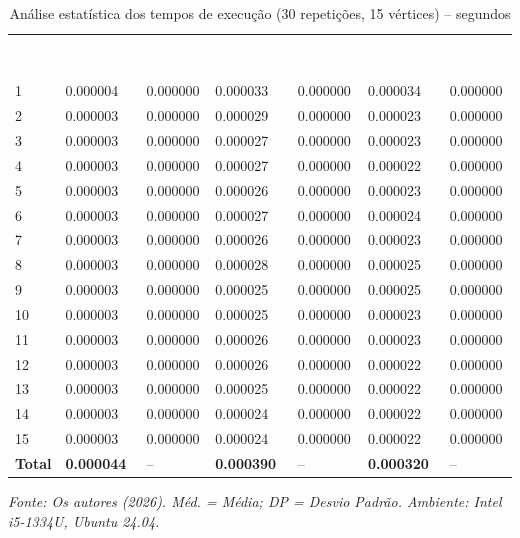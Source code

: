 \documentclass[12pt, a4paper]{article}
\begin{document}
\begin{table}[H]
\centering
\caption{Análise estatística dos tempos de execução (30 repetições, 15 vértices) -- segundos}
\small
\begin{tabular}{lllllll}
\rowcolor{azulescuro}
\textcolor{white}{\textbf{Orig.}} & \textcolor{white}{\textbf{Méd. Dij.}} & \textcolor{white}{\textbf{DP Dij.}} & \textcolor{white}{\textbf{Méd. Bel.}} & \textcolor{white}{\textbf{DP Bel.}} & \textcolor{white}{\textbf{Méd. FW}} & \textcolor{white}{\textbf{DP FW}} \\
1  & 0.000004 & 0.000000 & 0.000033 & 0.000000 & 0.000034 & 0.000000 \\
2  & 0.000003 & 0.000000 & 0.000029 & 0.000000 & 0.000023 & 0.000000 \\
3  & 0.000003 & 0.000000 & 0.000027 & 0.000000 & 0.000023 & 0.000000 \\
4  & 0.000003 & 0.000000 & 0.000027 & 0.000000 & 0.000022 & 0.000000 \\
5  & 0.000003 & 0.000000 & 0.000026 & 0.000000 & 0.000023 & 0.000000 \\
6  & 0.000003 & 0.000000 & 0.000027 & 0.000000 & 0.000024 & 0.000000 \\
7  & 0.000003 & 0.000000 & 0.000026 & 0.000000 & 0.000023 & 0.000000 \\
8  & 0.000003 & 0.000000 & 0.000028 & 0.000000 & 0.000025 & 0.000000 \\
9  & 0.000003 & 0.000000 & 0.000025 & 0.000000 & 0.000025 & 0.000000 \\
10 & 0.000003 & 0.000000 & 0.000025 & 0.000000 & 0.000023 & 0.000000 \\
11 & 0.000003 & 0.000000 & 0.000026 & 0.000000 & 0.000023 & 0.000000 \\
12 & 0.000003 & 0.000000 & 0.000026 & 0.000000 & 0.000022 & 0.000000 \\
13 & 0.000003 & 0.000000 & 0.000025 & 0.000000 & 0.000022 & 0.000000 \\
14 & 0.000003 & 0.000000 & 0.000024 & 0.000000 & 0.000022 & 0.000000 \\
15 & 0.000003 & 0.000000 & 0.000024 & 0.000000 & 0.000022 & 0.000000 \\
\midrule
\textbf{Total} & \textbf{0.000044} & -- & \textbf{0.000390} & -- & \textbf{0.000320} & -- \\
\bottomrule
\end{tabular}
\label{tab:estatistica}
\end{table}
\vspace{-0.3cm}
\begin{center}\small\textit{Fonte: Os autores (2026). Méd. = Média; DP = Desvio Padrão. Ambiente: Intel i5-1334U, Ubuntu 24.04.}\end{center}
\end{document}
